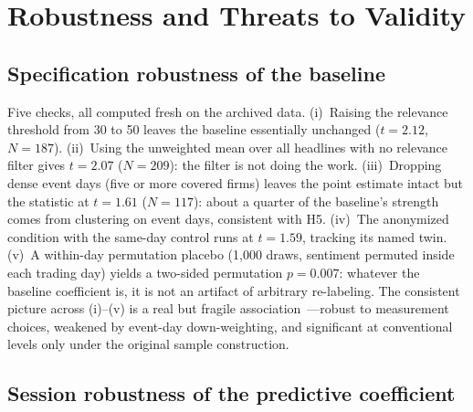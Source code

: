 \section{Robustness and Threats to Validity}\label{sec:robust}

\subsection{Specification robustness of the baseline}

Five checks, all computed fresh on the archived data. (i)~Raising the relevance threshold from 30 to 50 leaves the baseline essentially unchanged ($t=2.12$, $N=187$). (ii)~Using the unweighted mean over all headlines with no relevance filter gives $t=2.07$ ($N=209$): the filter is not doing the work. (iii)~Dropping dense event days (five or more covered firms) leaves the point estimate intact but the statistic at $t=1.61$ ($N=117$): about a quarter of the baseline's strength comes from clustering on event days, consistent with H5. (iv)~The anonymized condition with the same-day control runs at $t=1.59$, tracking its named twin. (v)~A within-day permutation placebo (1{,}000 draws, sentiment permuted inside each trading day) yields a two-sided permutation $p=0.007$: whatever the baseline coefficient is, it is not an artifact of arbitrary re-labeling. The consistent picture across (i)--(v) is a real but fragile association~---robust to measurement choices, weakened by event-day down-weighting, and significant at conventional levels only under the original sample construction.

\subsection{Session robustness of the predictive coefficient}

